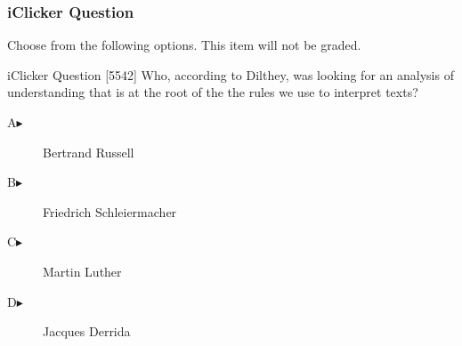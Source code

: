 \begin{frame}
  \frametitle{iClicker Question}
Choose from the following options. This item will not be graded.
\begin{block}{iClicker Question}
[5542] Who, according to Dilthey, was looking for an analysis of
understanding that is at the root of the the rules we use to interpret texts?
\end{block}
\begin{description}
\item[A\hspace{.2in}$\blacktriangleright$] Bertrand Russell
\item[B\hspace{.2in}$\blacktriangleright$] Friedrich Schleiermacher
\item[C\hspace{.2in}$\blacktriangleright$] Martin Luther
\item[D\hspace{.2in}$\blacktriangleright$] Jacques Derrida
\end{description}
\end{frame}
